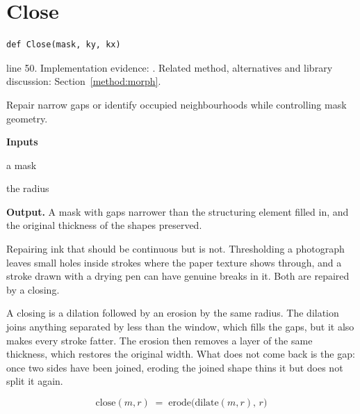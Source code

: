 \section{Close}\label{fn:segment:Close}
\begin{lstlisting}[style=sig]
def Close(mask, ky, kx)
\end{lstlisting}
 line 50. Implementation evidence: \cite{code2026}. Related method, alternatives and library discussion: Section~\ref{method:morph}.


Repair narrow gaps or identify occupied neighbourhoods while controlling mask geometry.




\noindent\textbf{Inputs}
\begin{description}[leftmargin=2.2em,style=nextline,font=\normalfont\ttfamily]\setlength\itemsep{1pt}
  \item[{m}] \normalfont a mask
  \item[{r}] \normalfont the radius
\end{description}

\noindent\textbf{Output.} A mask with gaps narrower than the structuring element filled in, and the original thickness of the shapes preserved.


Repairing ink that should be continuous but is not. Thresholding a photograph leaves small holes inside strokes where the paper texture shows through, and a stroke drawn with a drying pen can have genuine breaks in it. Both are repaired by a closing.


A closing is a dilation followed by an erosion by the same radius. The dilation joins anything separated by less than the window, which fills the gaps, but it also makes every stroke fatter. The erosion then removes a layer of the same thickness, which restores the original width. What does not come back is the gap: once two sides have been joined, eroding the joined shape thins it but does not split it again.


\begin{equation}
\mathrm{close}(m,r) \;=\; \mathrm{erode}\big(\mathrm{dilate}(m,r),\, r\big)
\end{equation}

